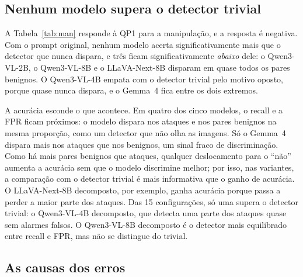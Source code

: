 \documentclass[conference]{IEEEtran}
\begin{document}
\subsection{Nenhum modelo supera o detector trivial}
A Tabela~\ref{tab:man} responde à QP1 para a manipulação, e a resposta é negativa. Com o prompt original,
nenhum modelo acerta significativamente mais que o detector que nunca dispara, e três ficam
significativamente \emph{abaixo} dele: o Qwen3-VL-2B, o Qwen3-VL-8B e o LLaVA-Next-8B disparam em quase
todos os pares benignos. O Qwen3-VL-4B empata com o detector trivial pelo motivo oposto, porque quase
nunca dispara, e o Gemma~4 fica entre os dois extremos.

A acurácia esconde o que acontece. Em quatro dos cinco modelos, o recall e a FPR ficam próximos: o modelo
dispara nos ataques e nos pares benignos na mesma proporção, como um detector que não olha as imagens.
Só o Gemma~4 dispara mais nos ataques que nos benignos, um sinal fraco de discriminação. Como há mais
pares benignos que ataques, qualquer deslocamento para o ``não'' aumenta a acurácia sem que o modelo
discrimine melhor; por isso, nas variantes, a comparação com o detector trivial é mais informativa que o
ganho de acurácia. O LLaVA-Next-8B decomposto, por exemplo, ganha acurácia porque passa a perder a maior
parte dos ataques. Das 15 configurações, só uma supera o detector trivial: o Qwen3-VL-4B decomposto, que
detecta uma parte dos ataques quase sem alarmes falsos. O Qwen3-VL-8B decomposto é o detector mais
equilibrado entre recall e FPR, mas não se distingue do trivial.

\subsection{As causas dos erros}
\label{sec:res-man-causas}
\end{document}

